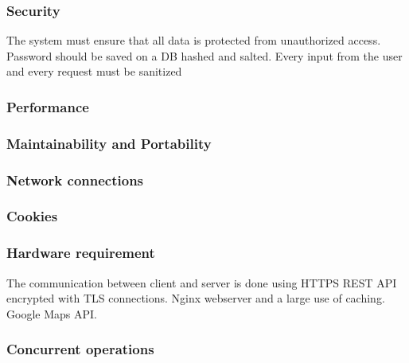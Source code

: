 \begin{itemize}
\subsubsection{Security}

The system must ensure that all data is protected from unauthorized
access. Password should be saved on a DB hashed and salted.
Every input from the user and every request must be sanitized 

\end{itemize}






\subsubsection{Performance}


\subsubsection{Maintainability and Portability}




\subsubsection{Network connections}


\subsubsection{Cookies}



\subsubsection{Hardware requirement}
The communication between client and server is done using HTTPS REST API encrypted with TLS connections.
Nginx webserver and a large use of caching.
Google Maps API.



\subsubsection{Concurrent operations}

\pagebreak


